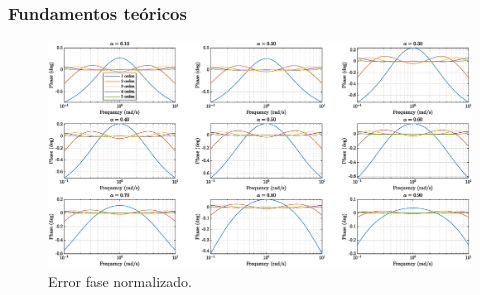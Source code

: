 \documentclass[10pt]{beamer}
\begin{document}
	\begin{frame}
		\frametitle{Fundamentos teóricos}
		\begin{figure}[hbtp]
			\caption{Error fase normalizado.}
			\centering
			\includegraphics[trim={0cm 0cm 0cm 0.2cm},clip,width=1.3\textheight]{../imagenes/F9_bode_error_fase_norm_c.eps}
		\end{figure}
	\end{frame}	
\end{document}
